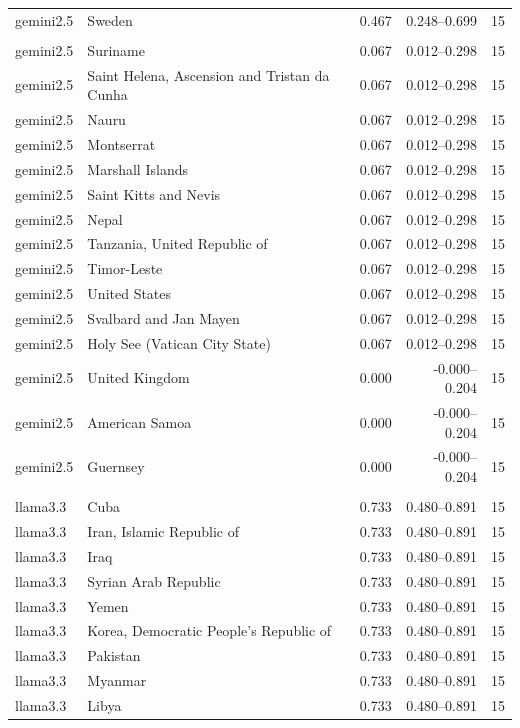 \begin{tabular}{l l r r r}
gemini2.5 & Sweden & 0.467 & 0.248–0.699 & 15\\
\addlinespace
\multicolumn{5}{l}{\textit{gemini2.5 — Bottom 15}}\\
gemini2.5 & Suriname & 0.067 & 0.012–0.298 & 15\\
gemini2.5 & Saint Helena, Ascension and Tristan da Cunha & 0.067 & 0.012–0.298 & 15\\
gemini2.5 & Nauru & 0.067 & 0.012–0.298 & 15\\
gemini2.5 & Montserrat & 0.067 & 0.012–0.298 & 15\\
gemini2.5 & Marshall Islands & 0.067 & 0.012–0.298 & 15\\
gemini2.5 & Saint Kitts and Nevis & 0.067 & 0.012–0.298 & 15\\
gemini2.5 & Nepal & 0.067 & 0.012–0.298 & 15\\
gemini2.5 & Tanzania, United Republic of & 0.067 & 0.012–0.298 & 15\\
gemini2.5 & Timor-Leste & 0.067 & 0.012–0.298 & 15\\
gemini2.5 & United States & 0.067 & 0.012–0.298 & 15\\
gemini2.5 & Svalbard and Jan Mayen & 0.067 & 0.012–0.298 & 15\\
gemini2.5 & Holy See (Vatican City State) & 0.067 & 0.012–0.298 & 15\\
gemini2.5 & United Kingdom & 0.000 & -0.000–0.204 & 15\\
gemini2.5 & American Samoa & 0.000 & -0.000–0.204 & 15\\
gemini2.5 & Guernsey & 0.000 & -0.000–0.204 & 15\\
\addlinespace
\multicolumn{5}{l}{\textit{llama3.3 — Top 15}}\\
llama3.3 & Cuba & 0.733 & 0.480–0.891 & 15\\
llama3.3 & Iran, Islamic Republic of & 0.733 & 0.480–0.891 & 15\\
llama3.3 & Iraq & 0.733 & 0.480–0.891 & 15\\
llama3.3 & Syrian Arab Republic & 0.733 & 0.480–0.891 & 15\\
llama3.3 & Yemen & 0.733 & 0.480–0.891 & 15\\
llama3.3 & Korea, Democratic People's Republic of & 0.733 & 0.480–0.891 & 15\\
llama3.3 & Pakistan & 0.733 & 0.480–0.891 & 15\\
llama3.3 & Myanmar & 0.733 & 0.480–0.891 & 15\\
llama3.3 & Libya & 0.733 & 0.480–0.891 & 15\\

\end{tabular}
